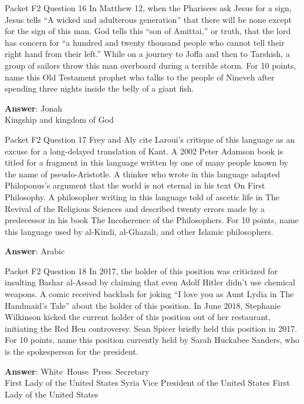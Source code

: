 \begin{frame}{Packet F2 Question 16}
In Matthew 12, when the   Pharisees ask Jesus for a sign, Jesus tells “A wicked and adulterous generation”   that there will be none except for the sign of this man. God tells this “son of Amittai,” or truth,     that the lord has concern for “a hundred and twenty thousand people who cannot tell their right hand from their left.” While on a journey to Joffa and then to Tarshish, a group   of sailors throw this man overboard during a terrible storm. For 10 points, name this Old Testament prophet who talks to the people of Nineveh after spending three nights inside the belly of a giant fish.

\textbf{Answer}: Jonah\\
 Kingship and kingdom of God
\end{frame}

\begin{frame}{Packet F2 Question 17}
Frey and Aly cite Laroui's critique of this language as an excuse for a long-delayed translation of Kant. A 2002 Peter Adamson book is titled for a fragment in this language written   by one of many people known by the name of pseudo-Aristotle.   A thinker who wrote   in this language adapted Philoponus’s argument that the world is not eternal in his text On First Philosophy. A philosopher writing in this language told of ascetic life in The Revival of the Religious Sciences and described twenty errors made by a predecessor in his book The Incoherence of the Philosophers.   For 10 points, name this language used by al-Kindi, al-Ghazali, and other Islamic philosophers.

\textbf{Answer}: Arabic\\
\end{frame}

\begin{frame}{Packet F2 Question 18}
In 2017, the holder of this position was criticized   for insulting Bashar al-Assad   by claiming that even Adolf Hitler didn’t use chemical weapons. A comic received backlash for joking “I love you as Aunt Lydia in The Handmaid’s Tale” about the holder of this position. In June 2018, Stephanie Wilkinson kicked the current holder of this position out of her restaurant, initiating the Red Hen controversy. Sean Spicer briefly held this position in 2017. For 10 points, name this position currently held by Sarah Huckabee Sanders, who is the spokesperson for the president.    

\textbf{Answer}: White\ House\ Press\ Secretary\\
 First Lady of the United States
 Syria
 Vice President of the United States
 First Lady of the United States
\end{frame}

